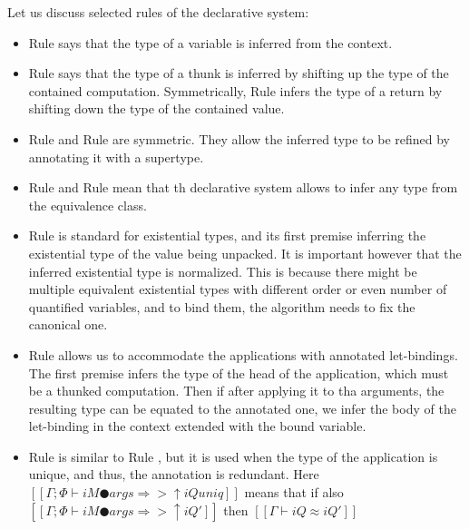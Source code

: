 \documentclass[a4,natbib=false]{article}
\newcommand{\ruleref}[1]{Rule \nameref{#1}}
\begin{document}
Let us discuss selected rules of the declarative system:
\begin{itemize}
  \item \ruleref{\ottdruleDTVarLabel}
    says that the type of a variable is inferred from the context.
  \item \ruleref{\ottdruleDTThunkLabel} says
    that the type of a thunk is inferred by shifting up the type of the 
    contained computation. Symmetrically, \ruleref{\ottdruleDTReturnLabel}
    infers the type of a return by shifting down the type of the
    contained value.
  \item \ruleref{\ottdruleDTPAnnotLabel} and \ruleref{\ottdruleDTNAnnotLabel} are symmetric.
    They allow the inferred type to be refined by annotating it with a supertype.
  \item \ruleref{\ottdruleDTNEquivLabel} and \ruleref{\ottdruleDTPEquivLabel}
    mean that th declarative system allows to infer any type from the equivalence class.
  \item \ruleref{\ottdruleDTUnpackLabel} is standard for existential types,
    and its first premise inferring the existential type of the value being unpacked.
    It is important however that the inferred existential type is normalized. 
    This is because there might be multiple equivalent existential types 
    with different order or even number of quantified variables, 
    and to bind them, the algorithm needs to fix the canonical one.
  \item \ruleref{\ottdruleDTAppLetAnnLabel} allows us to accommodate the applications
    with annotated let-bindings. The first premise infers the type of the head of the application,
    which must be a thunked computation. Then if after applying it 
    to tha arguments, the resulting type can be equated to the annotated one,
    we infer the body of the let-binding in the context extended with the bound variable.
  \item \ruleref{\ottdruleDTAppLetLabel} is similar to \ruleref{\ottdruleDTAppLetAnnLabel},
    but it is used when the type of the application is unique, and thus, the annotation
    is redundant. Here $[[Γ ; Φ ⊢ iM ● args ⇒> ↑iQ uniq]]$ means that
    if also $[[Γ ; Φ ⊢ iM ● args ⇒> ↑iQ']]$ then $[[Γ ⊢ iQ ≈ iQ']]$
\end{itemize}
\end{document}
